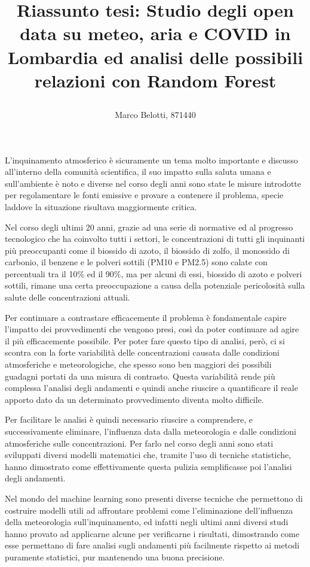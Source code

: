 \documentclass[a4paper]{article}
\title{Riassunto tesi: Studio degli open data su meteo, aria e COVID\-19 in Lombardia ed analisi delle possibili relazioni con Random Forest\author{Marco Belotti, 871440}}
\begin{document}
\maketitle

L'inquinamento atmosferico è sicuramente un tema molto importante e discusso all'interno della comunità scientifica, il suo impatto sulla saluta umana e sull'ambiente è noto e diverse nel corso degli anni sono state le misure introdotte per regolamentare le fonti emissive e provare a contenere il problema, specie laddove la situazione risultava maggiormente critica.  

Nel corso degli ultimi 20 anni, grazie ad una serie di normative ed al progresso tecnologico che ha coinvolto tutti i settori, le concentrazioni di tutti gli inquinanti più preoccupanti come il biossido di azoto, il biossido di zolfo, il monossido di carbonio, il benzene e le polveri sottili (PM10 e PM2.5) sono calate con percentuali tra il 10\% ed il 90\%, ma per alcuni di essi, biossido di azoto e polveri sottili, rimane una certa preoccupazione a causa della potenziale pericolosità sulla salute delle concentrazioni attuali.

Per continuare a contrastare efficacemente il problema è fondamentale capire l'impatto dei provvedimenti che vengono presi, così da poter continuare ad agire il più efficacemente possibile. Per poter fare questo tipo di analisi, però, ci si scontra con la forte variabilità delle concentrazioni causata dalle condizioni atmosferiche e meteorologiche, che spesso sono ben maggiori dei possibili guadagni portati da una misura di contrasto. Questa variabilità rende più complessa l'analisi degli andamenti e quindi anche riuscire a quantificare il reale apporto dato da un determinato provvedimento diventa molto difficile.

Per facilitare le analisi è quindi necessario riuscire a comprendere, e successivamente eliminare, l'influenza data dalla meteorologia e dalle condizioni atmosferiche sulle concentrazioni. Per farlo nel corso degli anni sono stati sviluppati diversi modelli matematici che, tramite l'uso di tecniche statistiche, hanno dimostrato come effettivamente questa pulizia semplificasse poi l'analisi degli andamenti.

Nel mondo del machine learning sono presenti diverse tecniche che permettono di costruire modelli utili ad affrontare problemi come l'eliminazione dell'influenza della meteorologia sull'inquinamento, ed infatti negli ultimi anni diversi studi hanno provato ad applicarne alcune per verificarne i risultati, dimostrando come esse permettano di fare analisi sugli andamenti più facilmente rispetto ai metodi puramente statistici, pur mantenendo una buona precisione.
\end{document}
